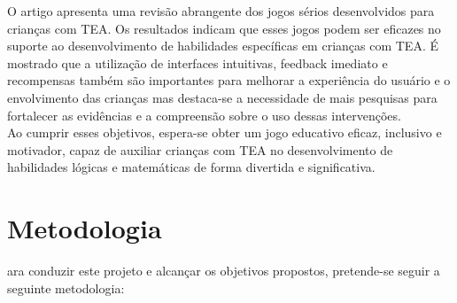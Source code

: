 \documentclass[tcc1,project]{classe_uftex/uftex}
\begin{document}
O artigo \cite{Zakari} apresenta uma revisão abrangente dos jogos sérios desenvolvidos para crianças com TEA. Os resultados indicam que esses jogos podem ser eficazes no suporte ao desenvolvimento de habilidades específicas em crianças com TEA. É mostrado que a utilização de interfaces intuitivas, feedback imediato e recompensas também são importantes para melhorar a experiência do usuário e o envolvimento das crianças mas destaca-se a necessidade de mais pesquisas para fortalecer as evidências e a compreensão sobre o uso dessas intervenções.\\

Ao cumprir esses objetivos, espera-se obter um jogo educativo eficaz, inclusivo e motivador, capaz de auxiliar crianças com TEA no desenvolvimento de habilidades lógicas e matemáticas de forma divertida e significativa.

\section*{Metodologia}

ara conduzir este projeto e alcançar os objetivos propostos, pretende-se seguir a seguinte metodologia:
\end{document}
